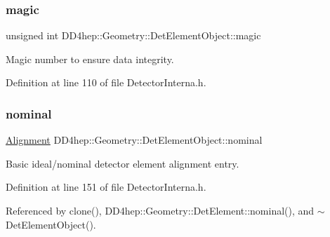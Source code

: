 \hypertarget{class_d_d4hep_1_1_geometry_1_1_det_element_object_a9a65b2f4323f3df2d7bdb7858b216fb6}{}\label{class_d_d4hep_1_1_geometry_1_1_det_element_object_a9a65b2f4323f3df2d7bdb7858b216fb6} 
\subsubsection{\texorpdfstring{magic}{magic}}
{\footnotesize\ttfamily unsigned int D\+D4hep\+::\+Geometry\+::\+Det\+Element\+Object\+::magic}



Magic number to ensure data integrity. 



Definition at line 110 of file Detector\+Interna.\+h.

\hypertarget{class_d_d4hep_1_1_geometry_1_1_det_element_object_a3020acb0795114c57c8d5bb536f310f4}{}\label{class_d_d4hep_1_1_geometry_1_1_det_element_object_a3020acb0795114c57c8d5bb536f310f4} 
\subsubsection{\texorpdfstring{nominal}{nominal}}
{\footnotesize\ttfamily \hyperlink{class_d_d4hep_1_1_geometry_1_1_det_element_object_aaf1bb49d0e1799f548f775b35e3cb590}{Alignment} D\+D4hep\+::\+Geometry\+::\+Det\+Element\+Object\+::nominal}



Basic ideal/nominal detector element alignment entry. 



Definition at line 151 of file Detector\+Interna.\+h.



Referenced by clone(), D\+D4hep\+::\+Geometry\+::\+Det\+Element\+::nominal(), and $\sim$\+Det\+Element\+Object().

\hypertarget{class_d_d4hep_1_1_geometry_1_1_det_element_object_a70ce8bf0603c0a7a4f6331faf71e66b6}{}\label{class_d_d4hep_1_1_geometry_1_1_det_element_object_a70ce8bf0603c0a7a4f6331faf71e66b6} 
